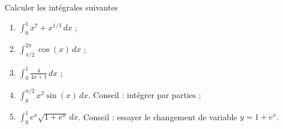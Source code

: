 
\begin{exercice}\label{exoExamenDecembre2010-0004}

Calculer les intégrales suivantes
\begin{enumerate}
\item $\displaystyle \int_{0}^{1}x^{7}+x^{1/3}\,dx$ ;
\item $\displaystyle \int_{\pi/2}^{2\pi}\cos(x)\,dx$ ;
\item $\displaystyle \int_{0}^{1}\frac{4}{4x+1}\,dx$ ;
\item $\displaystyle \int_{0}^{\pi/2}x^2\sin(x)\,dx$. Conseil : intégrer par parties ;
\item $\displaystyle \int_{0}^{1}e^x\sqrt{1+e^x}\,dx$. Conseil : essayer le changement de variable $y=1+e^x$.
\end{enumerate}

\end{exercice}

